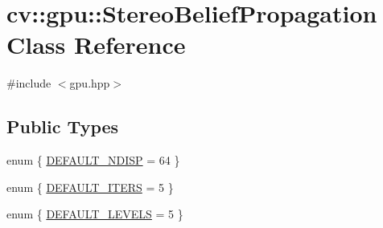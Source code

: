 \hypertarget{classcv_1_1gpu_1_1StereoBeliefPropagation}{\section{cv\-:\-:gpu\-:\-:Stereo\-Belief\-Propagation Class Reference}
\label{classcv_1_1gpu_1_1StereoBeliefPropagation}
}


{\ttfamily \#include $<$gpu.\-hpp$>$}

\subsection*{Public Types}
\begin{DoxyCompactItemize}
\item 
enum \{ \hyperlink{classcv_1_1gpu_1_1StereoBeliefPropagation_a325b976b8eca6b8d84a8300ff33b16f8aecfcc3cfb804629964bf3c1b1e43d208}{D\-E\-F\-A\-U\-L\-T\-\_\-\-N\-D\-I\-S\-P} = 64
 \}
\item 
enum \{ \hyperlink{classcv_1_1gpu_1_1StereoBeliefPropagation_a5b44f8076697e28779d65c5ee23d5319a82ed1ac88762686b4b120f335c471fc4}{D\-E\-F\-A\-U\-L\-T\-\_\-\-I\-T\-E\-R\-S} = 5
 \}
\item 
enum \{ \hyperlink{classcv_1_1gpu_1_1StereoBeliefPropagation_a64bc6ee2db8d4fb1ba7f0a7fd53cd14fa1768c3b920473c62f5b20668842a8fc7}{D\-E\-F\-A\-U\-L\-T\-\_\-\-L\-E\-V\-E\-L\-S} = 5
 \}
\end{DoxyCompactItemize}
